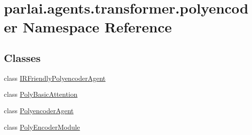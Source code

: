 \hypertarget{namespaceparlai_1_1agents_1_1transformer_1_1polyencoder}{}\section{parlai.\+agents.\+transformer.\+polyencoder Namespace Reference}
\label{namespaceparlai_1_1agents_1_1transformer_1_1polyencoder}
\subsection*{Classes}
\begin{DoxyCompactItemize}
\item 
class \hyperlink{classparlai_1_1agents_1_1transformer_1_1polyencoder_1_1IRFriendlyPolyencoderAgent}{I\+R\+Friendly\+Polyencoder\+Agent}
\item 
class \hyperlink{classparlai_1_1agents_1_1transformer_1_1polyencoder_1_1PolyBasicAttention}{Poly\+Basic\+Attention}
\item 
class \hyperlink{classparlai_1_1agents_1_1transformer_1_1polyencoder_1_1PolyencoderAgent}{Polyencoder\+Agent}
\item 
class \hyperlink{classparlai_1_1agents_1_1transformer_1_1polyencoder_1_1PolyEncoderModule}{Poly\+Encoder\+Module}
\end{DoxyCompactItemize}
